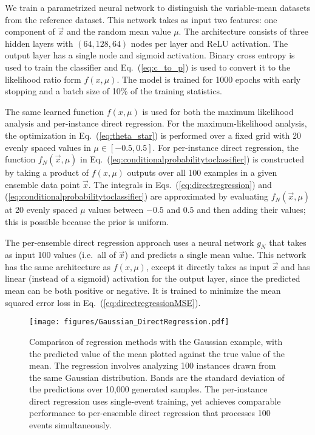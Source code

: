 \documentclass[aps,prx,reprint,preprintnumbers,superscriptaddress,nofootinbib,longbibliography,floatfix]{revtex4-2}
\DeclareRobustCommand{\Eq}[1]{Eq.~(\ref{eq:#1})}
\DeclareRobustCommand{\Eqs}[2]{Eqs.~(\ref{eq:#1}) and (\ref{eq:#2})}
\begin{document}
We train a parametrized neural network to distinguish the variable-mean datasets from the reference dataset.
%
This network takes as input two features: one component of $\vec{x}$ and the random mean value $\mu$.
%
The architecture consists of three hidden layers with $(64, 128, 64)$ nodes per layer and ReLU activation.
%
The output layer has a single node and sigmoid activation.
%
Binary cross entropy is used to train the classifier and \Eq{c_to_p} is used to convert it to the likelihood ratio form $f(x,\mu)$.
%
The model is trained for 1000 epochs with early stopping and a batch size of 10\% of the training statistics.


The same learned function $f(x,\mu)$ is used for both the maximum likelihood analysis and per-instance direct regression.
%
For the maximum-likelihood analysis, the optimization in \Eq{theta_star} is performed over a fixed grid with 20 evenly spaced values in $\mu \in [-0.5,0.5]$.
%
For per-instance direct regression, the function $f_N(\vec{x},\mu)$ in \Eq{conditionalprobabilitytoclassifier} is constructed by taking a product of $f(x,\mu)$ outputs over all 100 examples in a given ensemble data point $\vec{x}$.
%
The integrals in \Eqs{directregression}{conditionalprobabilitytoclassifier} are approximated by evaluating $f_N(\vec{x},\mu)$ at 20 evenly spaced $\mu$ values between $-0.5$ and $0.5$ and then adding their values; this is possible because the prior is uniform.  


The per-ensemble direct regression approach uses a neural network $g_N$ that takes as input 100 values (i.e.\ all of $\vec{x}$) and predicts a single mean value.
%
This network has the same architecture as $f(x,\mu)$, except it directly takes as input $\vec{x}$ and has linear (instead of a sigmoid) activation for the output layer, since the predicted mean can be both positive or negative.  
%
It is trained to minimize the mean squared error loss in \Eq{directregressionMSE}.


 \begin{figure}[t]
 \centering
 \texttt{[image: figures/Gaussian\_DirectRegression.pdf]}
 \caption{
 Comparison of regression methods with the Gaussian example, with the predicted value of the mean plotted against the true value of the mean.
 The regression involves analyzing 100 instances drawn from the same Gaussian distribution.
 Bands are the standard deviation of the predictions over 10,000 generated samples.
 The per-instance direct regression uses single-event training, yet achieves comparable performance to per-ensemble direct regression that processes 100 events simultaneously.}
 \label{fig:Gaussianregression}
 \end{figure}
\end{document}
